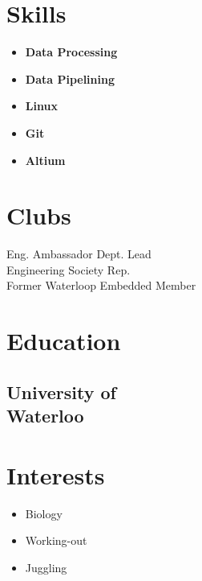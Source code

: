 \documentclass[]{chandan-cv}
\begin{document}
\begin{minipage}[t]{0.23\textwidth}

\section{Skills}
	\begin{itemize}
		\setlength\itemsep{-0.17em}
		\item \textbf{Data Processing}
		\item \textbf{Data Pipelining}
		\item \textbf{Linux}
		\item \textbf{Git}
		\item \textbf{Altium}
	\end{itemize}

\section{Clubs}
Eng. Ambassador Dept. Lead \\
Engineering Society Rep.\\
Former Waterloop Embedded Member
\sectionsep

\section{Education}

\subsection{University of \\
Waterloo}
\sectionsep

\section{Interests}
\begin{itemize}
	\setlength\itemsep{-0.3em}
	\item Biology
	\item Working-out
	\item Juggling
\end{itemize}
\sectionsep


%
%

\end{minipage}
\end{document}
